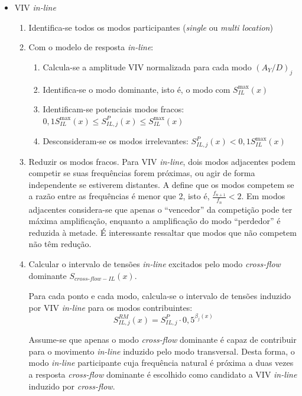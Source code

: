 \begin{itemize}
\item VIV \textit{in-line}

\begin{enumerate}
    \item Identifica-se todos os modos participantes (\textit{single} ou \textit{multi location})

    \item Com o modelo de resposta \textit{in-line}:

    \begin{enumerate}
    	\item Calcula-se a amplitude VIV normalizada para cada modo ${(A_Y/D)}_j$

    	\item Identifica-se o modo dominante, isto é, o modo com $S_\mathit{IL}^{\max}(x)$

    	\item Identificam-se potenciais modos fracos: $0,1 S_\mathit{IL}^{\max}(x) \leq S_{\mathit{IL}, \mathit{j}}^{P}(x) \leq S_\mathit{IL}^{\max}(x)$

    	\item Desconsideram-se os modos irrelevantes: $S_{\mathit{IL}, \mathit{j}}^{P}(x) < 0,1 S_\mathit{IL}^{\max}(x)$
    \end{enumerate}

        \item Reduzir os modos fracos.
        Para VIV \textit{in-line}, dois modos adjacentes podem competir se suas frequências forem próximas, ou agir de forma independente se estiverem distantes.
        A  define que os modos competem se a razão entre as frequências é menor que 2, isto é, $\frac{f_\mathit{n+1}}{f_n} < 2$.
        Em modos adjacentes considera-se que apenas o ``vencedor'' da competição pode ter máxima amplificação, enquanto a amplificação do modo ``perdedor'' é reduzida à metade. É interessante ressaltar que modos que não competem não têm redução.

        \item Calcular o intervalo de tensões \textit{in-line} excitados pelo modo \textit{cross-flow} dominante $S_{\mathit{\textit{cross-flow}}-\mathit{IL}}(x)$.

        Para cada ponto e cada modo, calcula-se o intervalo de tensões induzido por VIV \textit{in-line} para os modos contribuintes:
            \[S_{\mathit{IL}, \mathit{j}}^\mathit{RM}(x) = S_{\mathit{IL}, \mathit{j}}^{P} \cdot 0,5^{\beta_j (x)}\]

        Assume-se que apenas o modo \textit{cross-flow} dominante é capaz de contribuir para o movimento \textit{in-line} induzido pelo modo transversal.
        Desta forma, o modo \textit{in-line} participante cuja frequência natural é próxima a duas vezes a resposta \textit{cross-flow} dominante é escolhido como candidato a VIV \textit{in-line} induzido por \textit{cross-flow}.


\end{enumerate}
\end{itemize}
